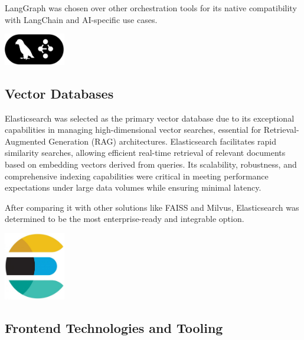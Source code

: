 LangGraph was chosen over other orchestration tools for its native compatibility with LangChain and AI-specific use cases.

\begin{center}
    \centering
    \includegraphics[width=0.2\textwidth]{Images/LangGraph Logo.png}
     \cite{langgraph_logo}
    \label{fig:langgraph_logo}
\end{center}

\subsection{Vector Databases}
Elasticsearch was selected as the primary vector database due to its exceptional capabilities in managing high-dimensional vector searches, essential for Retrieval-Augmented Generation (RAG) architectures. Elasticsearch facilitates rapid similarity searches, allowing efficient real-time retrieval of relevant documents based on embedding vectors derived from queries. Its scalability, robustness, and comprehensive indexing capabilities were critical in meeting performance expectations under large data volumes while ensuring minimal latency.\mynewline

After comparing it with other solutions like FAISS and Milvus, Elasticsearch was determined to be the most enterprise-ready and integrable option.

\begin{center}
    \centering
    \includegraphics[width=0.2\textwidth]{Images/Elasticsearch Logo.jpg}
     \cite{elasticsearch_logo}
    \label{fig:elasticsearch_logo}
\end{center}

\subsection{Frontend Technologies and Tooling}

